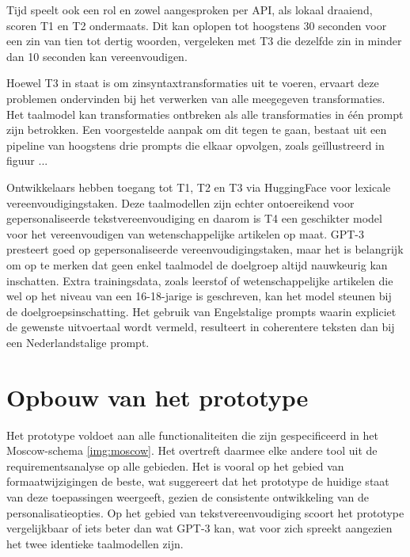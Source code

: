 \medspace

Tijd speelt ook een rol en zowel aangesproken per API, als lokaal draaiend, scoren T1 en T2 ondermaats. Dit kan oplopen tot hoogstens 30 seconden voor een zin van tien tot dertig woorden, vergeleken met T3 die dezelfde zin in minder dan 10 seconden kan vereenvoudigen.

\medspace

Hoewel T3 in staat is om zinsyntaxtransformaties uit te voeren, ervaart deze problemen ondervinden bij het verwerken van alle meegegeven transformaties. Het taalmodel kan transformaties ontbreken als alle transformaties in één prompt zijn betrokken. Een voorgestelde aanpak om dit tegen te gaan, bestaat uit een pipeline van hoogstens drie prompts die elkaar opvolgen, zoals geïllustreerd in figuur ...

\medspace

Ontwikkelaars hebben toegang tot T1, T2 en T3 via HuggingFace voor lexicale vereenvoudigingstaken. Deze taalmodellen zijn echter ontoereikend voor gepersonaliseerde tekstvereenvoudiging en daarom is T4 een geschikter model voor het vereenvoudigen van wetenschappelijke artikelen op maat. GPT-3 presteert goed op gepersonaliseerde vereenvoudigingstaken, maar het is belangrijk om op te merken dat geen enkel taalmodel de doelgroep altijd nauwkeurig kan inschatten. Extra trainingsdata, zoals leerstof of wetenschappelijke artikelen die wel op het niveau van een 16-18-jarige is geschreven, kan het model steunen bij de doelgroepsinschatting. Het gebruik van Engelstalige prompts waarin expliciet de gewenste uitvoertaal wordt vermeld, resulteert in coherentere teksten dan bij een Nederlandstalige prompt.

\section{Opbouw van het prototype}

Het prototype voldoet aan alle functionaliteiten die zijn gespecificeerd in het Moscow-schema \ref{img:moscow}. Het overtreft daarmee elke andere tool uit de requirementsanalyse op alle gebieden. Het is vooral op het gebied van formaatwijzigingen de beste, wat suggereert dat het prototype de huidige staat van deze toepassingen weergeeft, gezien de consistente ontwikkeling van de personalisatieopties. Op het gebied van tekstvereenvoudiging scoort het prototype vergelijkbaar of iets beter dan wat GPT-3 kan, wat voor zich spreekt aangezien het twee identieke taalmodellen zijn.

